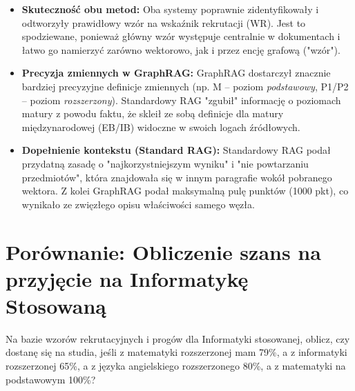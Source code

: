 \begin{tcolorbox}[colback=green!5!white,colframe=green!50!black,title=Wnioski i obserwacje]
    \begin{itemize}
        \item \textbf{Skuteczność obu metod:} Oba systemy poprawnie zidentyfikowały i odtworzyły prawidłowy wzór na wskaźnik rekrutacji (WR). Jest to spodziewane, ponieważ główny wzór występuje centralnie w dokumentach i łatwo go namierzyć zarówno wektorowo, jak i przez encję grafową ("wzór").
        \item \textbf{Precyzja zmiennych w GraphRAG:} GraphRAG dostarczył znacznie bardziej precyzyjne definicje zmiennych (np. M -- poziom \textit{podstawowy}, P1/P2 -- poziom \textit{rozszerzony}). Standardowy RAG "zgubił" informację o poziomach matury z powodu faktu, że skleił ze sobą definicje dla matury międzynarodowej (EB/IB) widoczne w swoich logach źródłowych.
        \item \textbf{Dopełnienie kontekstu (Standard RAG):} Standardowy RAG podał przydatną zasadę o "najkorzystniejszym wyniku" i "nie powtarzaniu przedmiotów", która znajdowała się w innym paragrafie wokół pobranego wektora. Z kolei GraphRAG podał maksymalną pulę punktów (1000 pkt), co wynikało ze zwięzłego opisu właściwości samego węzła.
    \end{itemize}
\end{tcolorbox}
\vspace{1em}

\newpage

\section*{Porównanie: Obliczenie szans na przyjęcie na Informatykę Stosowaną}

\begin{tcolorbox}[colback=blue!5!white,colframe=blue!75!black,title=Pytanie użytkownika]
    Na bazie wzorów rekrutacyjnych i progów dla Informatyki stosowanej, oblicz, czy dostanę się na studia, jeśli z matematyki rozszerzonej mam 79\%, a z informatyki rozszerzonej 65\%, a z języka angielskiego rozszerzonego 80\%, a z matematyki na podstawowym 100\%?
\end{tcolorbox}

